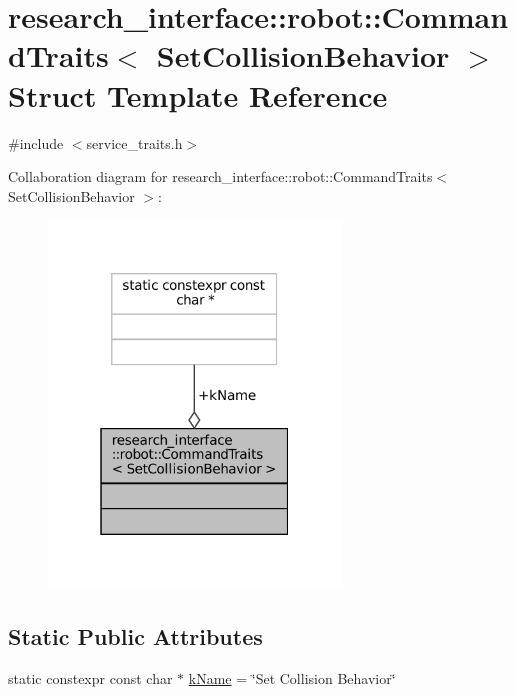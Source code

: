 \hypertarget{structresearch__interface_1_1robot_1_1CommandTraits_3_01SetCollisionBehavior_01_4}{}\section{research\+\_\+interface\+:\+:robot\+:\+:Command\+Traits$<$ Set\+Collision\+Behavior $>$ Struct Template Reference}
\label{structresearch__interface_1_1robot_1_1CommandTraits_3_01SetCollisionBehavior_01_4}


{\ttfamily \#include $<$service\+\_\+traits.\+h$>$}



Collaboration diagram for research\+\_\+interface\+:\+:robot\+:\+:Command\+Traits$<$ Set\+Collision\+Behavior $>$\+:
\nopagebreak
\begin{figure}[H]
\begin{center}
\leavevmode
\includegraphics[width=220pt]{structresearch__interface_1_1robot_1_1CommandTraits_3_01SetCollisionBehavior_01_4__coll__graph}
\end{center}
\end{figure}
\subsection*{Static Public Attributes}
\begin{DoxyCompactItemize}
\item 
static constexpr const char $\ast$ \hyperlink{structresearch__interface_1_1robot_1_1CommandTraits_3_01SetCollisionBehavior_01_4_a9656bf4cfea6a95a7df606599c45d52a}{k\+Name} = \char`\"{}Set Collision Behavior\char`\"{}
\end{DoxyCompactItemize}


